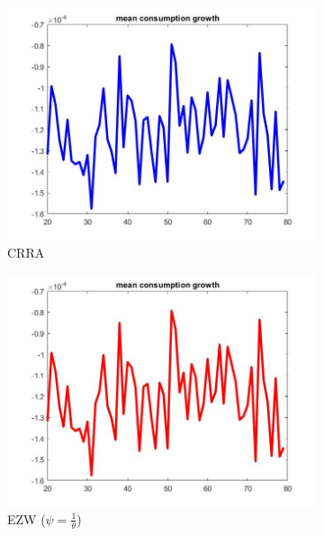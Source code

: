 \documentclass[12pt,a4paper]{article}
\begin{document}
\begin{figure}[h!]
  \centering
  \begin{subfigure}[b]{0.32\linewidth}
    \includegraphics[width=\linewidth]{graphs/Q2/mean_cons_growth.jpg}
    \caption{CRRA}
  \end{subfigure}
  \begin{subfigure}[b]{0.32\linewidth}
      \includegraphics[width=\linewidth]{graphs/Q4/mean_cons_grow_ezw--.jpg}
      \caption{EZW ($\psi = \frac{1}{\theta}$)}
  \end{subfigure}
  \begin{subfigure}[b]{0.32\linewidth}

\end{subfigure}
\end{figure}
\end{document}
